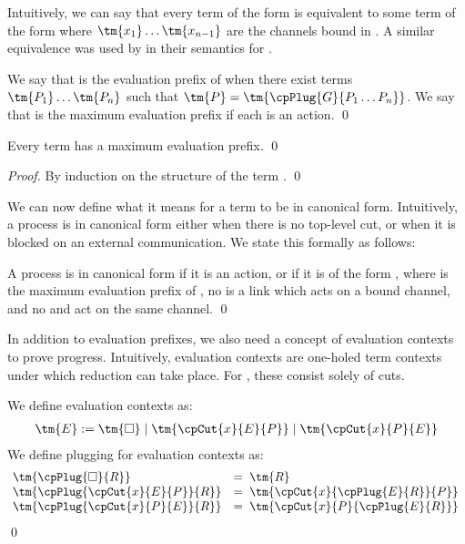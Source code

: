 \documentclass[UKenglish]{llncs}
\begin{document}
Intuitively, we can say that every term of the form
 is equivalent to some term of the form
where $\tm{x_1} \dots \tm{x_{n-1}}$ are the channels bound in .
A similar equivalence was used by  in their
semantics for \cp.
\begin{definition}\label{def:cp-maximum-evaluation-prefix}
  We say that  is the evaluation prefix of  when there exist terms
  $\tm{P_1} \dots \tm{P_n}$ such that $\tm{P} = \tm{\cpPlug{G}{P_1 \dots P_n}}$.
  We say that  is the maximum evaluation prefix if each  is an
  action. 
  \qed
\end{definition}
\begin{lemma}\label{thm:cp-maximum-evaluation-prefix}
  Every term  has a maximum evaluation prefix.
  \qed
\end{lemma}
\begin{proof}
  By induction on the structure of the term . 
  \qed
\end{proof}
We can now define what it means for a term to be in canonical form. Intuitively,
a process is in canonical form either when there is no top-level cut, or when it
is blocked on an external communication. We state this formally as follows:
\begin{definition}\label{def:cp-canonical-forms}
  A process  is in canonical form if it is an action, or if it is of the
  form , where  is the maximum evaluation
  prefix of , no  is a link which acts on a bound channel, and no
   and  act on the same channel.
  \qed
\end{definition}
In addition to evaluation prefixes, we also need a concept of evaluation
contexts to prove progress. Intuitively, evaluation contexts are one-holed term
contexts under which reduction can take place. For \cp, these consist solely of
cuts.
\begin{definition}\label{def:cp-evaluation-contexts}
  We define evaluation contexts as:
  \begin{align*}
    \tm{E} := \tm{\Box}
    \mid \tm{\cpCut{x}{E}{P}}
    \mid \tm{\cpCut{x}{P}{E}}
  \end{align*}
  We define plugging for evaluation contexts as:
  \begin{align*}
    \!\begin{array}{ll}
      \tm{\cpPlug{\Box}{R}}            
      & = \; \tm{R}
      \\
      \tm{\cpPlug{\cpCut{x}{E}{P}}{R}}
      & = \; \tm{\cpCut{x}{\cpPlug{E}{R}}{P}}
      \\
      \tm{\cpPlug{\cpCut{x}{P}{E}}{R}}
      & = \; \tm{\cpCut{x}{P}{\cpPlug{E}{R}}}
    \end{array}
  \end{align*}
  \qed
\end{definition}
\end{document}
